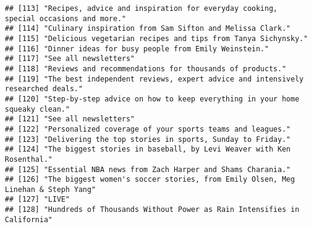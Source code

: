 \documentclass[
]{article}
\begin{document}
\begin{verbatim}
## [113] "Recipes, advice and inspiration for everyday cooking, special occasions and more."                                                                        
## [114] "Culinary inspiration from Sam Sifton and Melissa Clark."                                                                                                  
## [115] "Delicious vegetarian recipes and tips from Tanya Sichynsky."                                                                                              
## [116] "Dinner ideas for busy people from Emily Weinstein."                                                                                                       
## [117] "See all newsletters"                                                                                                                                      
## [118] "Reviews and recommendations for thousands of products."                                                                                                   
## [119] "The best independent reviews, expert advice and intensively researched deals."                                                                            
## [120] "Step-by-step advice on how to keep everything in your home squeaky clean."                                                                                
## [121] "See all newsletters"                                                                                                                                      
## [122] "Personalized coverage of your sports teams and leagues."                                                                                                  
## [123] "Delivering the top stories in sports, Sunday to Friday."                                                                                                  
## [124] "The biggest stories in baseball, by Levi Weaver with Ken Rosenthal."                                                                                      
## [125] "Essential NBA news from Zach Harper and Shams Charania."                                                                                                  
## [126] "The biggest women's soccer stories, from Emily Olsen, Meg Linehan & Steph Yang"                                                                           
## [127] "LIVE"                                                                                                                                                     
## [128] "Hundreds of Thousands Without Power as Rain Intensifies in California"                                                                                    

\end{verbatim}
\end{document}
